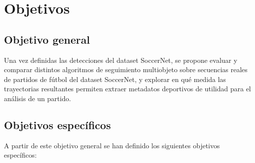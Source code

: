 \section{Objetivos}
\label{sec:intro-objetivos}

\subsection{Objetivo general}

Una vez definidas las detecciones del dataset SoccerNet, se propone evaluar y comparar distintos algoritmos de seguimiento multiobjeto sobre
secuencias reales de partidos de fútbol del dataset SoccerNet, y explorar
en qué medida las trayectorias resultantes permiten extraer metadatos
deportivos de utilidad para el análisis de un partido.

\subsection{Objetivos específicos}

A partir de este objetivo general se han definido los siguientes objetivos
específicos:

